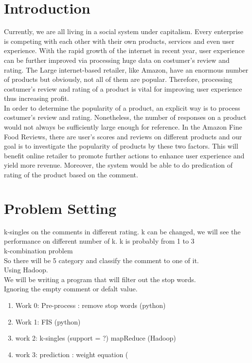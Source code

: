 \section{Introduction}
Currently, we are all living in a social system under capitalism. Every enterprise is competing with each other with their own products, services and even user experience. With the rapid growth of the internet in recent year, user experience can be further improved via processing huge data on costumer's review and rating. The Large internet-based retailer, like Amazon, have an enormous number of products but obviously, not all of them are popular. Therefore, processing costumer's review and rating of a product is vital for improving user experience thus increasing profit.\\
In order to determine the popularity of a product, an explicit way is to process costumer's review and rating. Nonetheless, the number of responses on a product would not always be sufficiently large enough for reference. In the Amazon Fine Food Reviews, there are user's scores and reviews on different products and our goal is to investigate the popularity of products by these two factors. This will benefit online retailer to promote further actions to enhance user experience and yield more revenue. Moreover, the system would be able to do predication of rating of the product based on the comment.


\section{Problem Setting}
k-singles on the comments in different rating. k can be changed, we will see the performance on different number of k. k is probably from 1 to 3\\
k-combination problem\\
So there will be 5 category and classify the comment to one of it.\\
Using Hadoop.\\
We will be writing a program that will filter out the stop words.\\
Ignoring the empty comment or defalt value.\\

\begin{enumerate}
\item Work 0: Pre-process : remove stop words (python)
\item Work 1: FIS (python)
\item work 2: k-singles (support = ?) mapReduce (Hadoop)
\item work 3: prediction : weight equation (
\end{enumerate}

